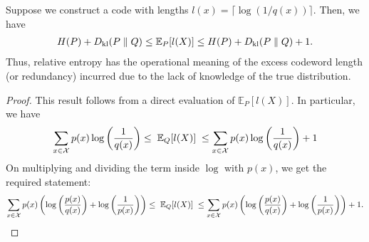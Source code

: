     \begin{theorem}
        \label{thm:misspecified-source-coding} Suppose we construct a code with lengths $l(x) = \lceil \log(1/q(x)) \rceil$. Then, we have 
        \begin{align}
            H(P) + D_{\text{kl}}(P \parallel Q) \leq \mathbb{E}_P[l(X)] \leq H(P) + D_{\text{kl}}(P \parallel Q) + 1. 
        \end{align}
        Thus, relative entropy has the operational meaning of the excess codeword length (or redundancy) incurred due to the lack of knowledge of the true distribution. 
    \end{theorem}
    \begin{proof}
        This result follows from a direct evaluation of $\mathbb{E}_P[l(X)]$. In particular, we have 
        \begin{align}
            \sum_{x \in \mathcal{X}} p(x) \log \left( \frac{1}{q(x)} \right)  \leq \; \mathbb{E}_Q[l(X)] \;  \leq 
            \sum_{x \in \mathcal{X}} p(x) \log \left( \frac{1}{q(x)} \right) + 1
        \end{align}
        On multiplying and dividing the term inside $\log$ with $p(x)$, we get the required statement:
        \begin{align}
            \sum_{x \in \mathcal{X}} p(x) \left(  \log \left( \frac{p(x)}{q(x)} \right)  + \log \left( \frac{1}{p(x)} \right) \right) \leq \; \mathbb{E}_Q[l(X)] \;  \leq 
            \sum_{x \in \mathcal{X}} p(x) \left(  \log \left( \frac{p(x)}{q(x)} \right)  + \log \left( \frac{1}{p(x)} \right) \right) +  1.
        \end{align}
    \end{proof}
    
